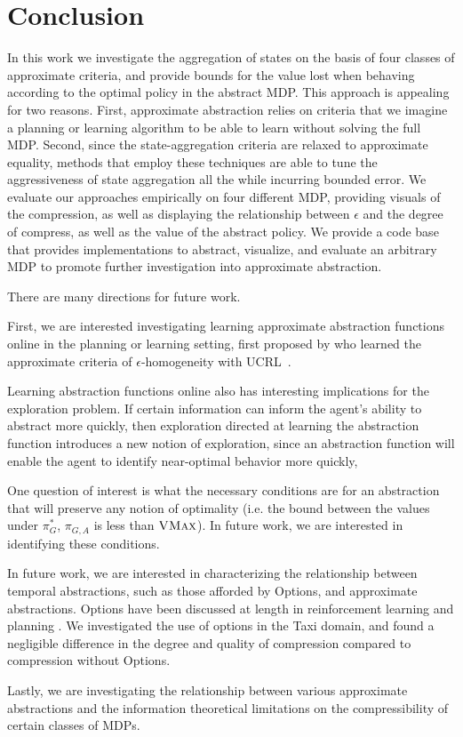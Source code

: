\section{Conclusion}

In this work we investigate the aggregation of states on the basis of four classes of approximate criteria, and provide bounds for the value lost when behaving according to the optimal policy in the abstract \ac{MDP}. This approach is appealing for two reasons. First, approximate abstraction relies on criteria that we imagine a planning or learning algorithm to be able to learn without solving the full \ac{MDP}. Second, since the state-aggregation criteria are relaxed to approximate equality, methods that employ these techniques are able to tune the aggressiveness of state aggregation all the while incurring bounded error. We evaluate our approaches empirically on four different \acs{MDP}, providing visuals of the compression, as well as displaying the relationship between $\epsilon$ and the degree of compress, as well as the value of the abstract policy. We provide a code base that provides implementations to abstract, visualize, and evaluate an arbitrary MDP to promote further investigation into approximate abstraction.

There are many directions for future work.

First, we are interested investigating learning approximate abstraction functions online in the planning or learning setting, first proposed by \citeauthor{ortner2013adaptive} who learned the approximate criteria of $\epsilon$-homogeneity with UCRL~\cite{ortner2007logarithmic}.

Learning abstraction functions online also has interesting implications for the exploration problem. If certain information can inform the agent's ability to abstract more quickly, then exploration directed at learning the abstraction function introduces a new notion of exploration, since an abstraction function will enable the agent to identify near-optimal behavior more quickly, 

One question of interest is what the necessary conditions are for an abstraction that will preserve any notion of optimality (i.e. the bound between the values under $\pi_G^*$, $\pi_{G,A}$ is less than $\textsc{VMax}$). In future work, we are interested in identifying these conditions.

In future work, we are interested in characterizing the relationship between temporal abstractions, such as those afforded by Options, and approximate abstractions. Options have been discussed at length in reinforcement learning and planning . We investigated the use of options in the Taxi domain, and found a negligible difference in the degree and quality of compression compared to compression without Options.  

Lastly, we are investigating the relationship between various approximate abstractions and the information theoretical limitations on the compressibility of certain classes of \acp{MDP}.

